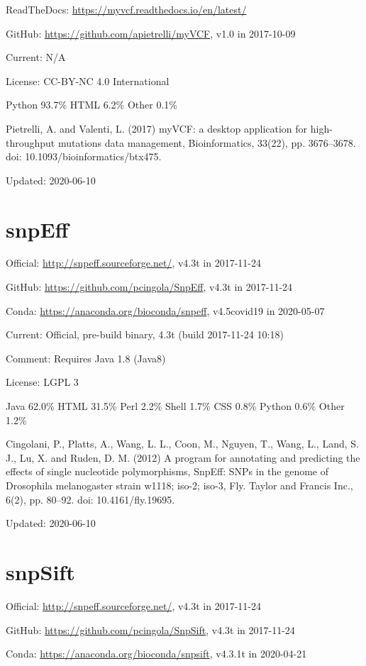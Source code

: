 \documentclass[]{article}
\begin{document}
ReadTheDocs: \url{https://myvcf.readthedocs.io/en/latest/}

GitHub: \url{https://github.com/apietrelli/myVCF}, v1.0 in 2017-10-09

Current: N/A

License: CC-BY-NC 4.0 International

Python 93.7\% HTML 6.2\% Other 0.1\%

Pietrelli, A. and Valenti, L. (2017) myVCF: a desktop application for high-throughput mutations data management, Bioinformatics, 33(22), pp. 3676–3678. doi: 10.1093/bioinformatics/btx475.

Updated: 2020-06-10
\section{snpEff}

Official: \url{http://snpeff.sourceforge.net/}, v4.3t in 2017-11-24

GitHub: \url{https://github.com/pcingola/SnpEff}, v4.3t in 2017-11-24

Conda: \url{https://anaconda.org/bioconda/snpeff}, v4.5covid19 in 2020-05-07

Current: Official, pre-build binary, 4.3t (build 2017-11-24 10:18)

Comment: Requires Java 1.8 (Java8)

License: LGPL 3

Java 62.0\% HTML 31.5\% Perl 2.2\% Shell 1.7\% CSS 0.8\% Python 0.6\% Other 1.2\%

Cingolani, P., Platts, A., Wang, L. L., Coon, M., Nguyen, T., Wang, L., Land, S. J., Lu, X. and Ruden, D. M. (2012) A program for annotating and predicting the effects of single nucleotide polymorphisms, SnpEff: SNPs in the genome of Drosophila melanogaster strain w1118; iso-2; iso-3, Fly. Taylor and Francis Inc., 6(2), pp. 80–92. doi: 10.4161/fly.19695.

Updated: 2020-06-10

\section{snpSift}

Official: \url{http://snpeff.sourceforge.net/}, v4.3t in 2017-11-24

GitHub: \url{https://github.com/pcingola/SnpSift}, v4.3t in 2017-11-24

Conda: \url{https://anaconda.org/bioconda/snpsift}, v4.3.1t in 2020-04-21
\end{document}
